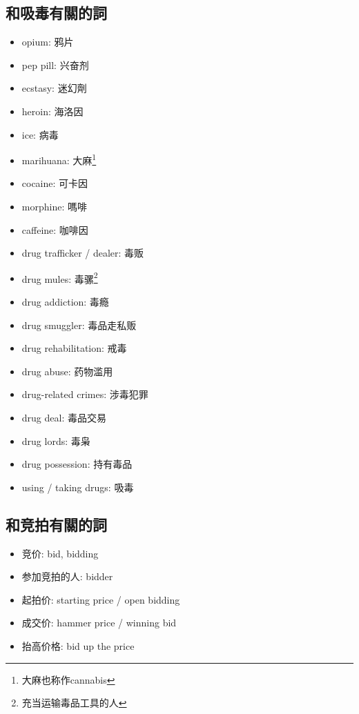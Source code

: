 \subsection{和吸毒有關的詞}
\begin{multicols}{3}
\begin{itemize}
  \itemsep0em
  \item opium: 鸦片
  \item pep pill: 兴奋剂
  \item ecstasy: 迷幻劑
  \item heroin: 海洛因
  \item ice: 病毒
  \item marihuana: 大麻\footnote{大麻也称作cannabis}
  \item cocaine: 可卡因
  \item morphine: 嗎啡
  \item caffeine: 咖啡因
\end{itemize}
\end{multicols}

\begin{multicols}{2}
\begin{itemize}
  \itemsep0em
  \item drug trafficker / dealer: 毒贩
  \item drug mules: 毒骡\footnote{充当运输毒品工具的人}
  \item drug addiction: 毒瘾
  \item drug smuggler: 毒品走私贩
  \item drug rehabilitation: 戒毒
  \item drug abuse: 药物滥用
  \item drug-related crimes: 涉毒犯罪
  \item drug deal: 毒品交易
  \item drug lords: 毒枭
  \item drug possession: 持有毒品
  \item using / taking drugs: 吸毒
\end{itemize}
\end{multicols}

\subsection{和竞拍有關的詞}
\begin{multicols}{2}
\begin{itemize}
  \itemsep0em
  \item 竞价: bid, bidding
  \item 参加竞拍的人: bidder
  \item 起拍价: starting price / open bidding
  \item 成交价: hammer price / winning bid
  \item 抬高价格: bid up the price
\end{itemize}
\end{multicols}

